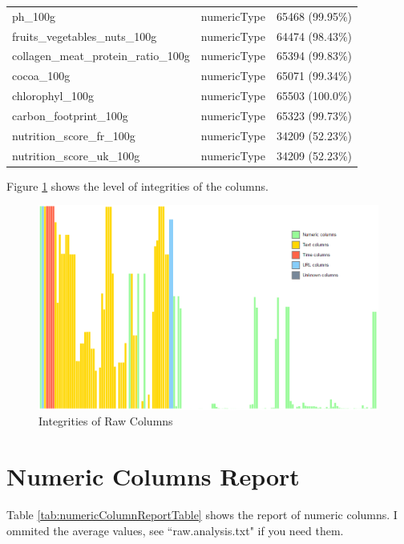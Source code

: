 \documentclass[11pt]{article}
\begin{document}
\begin{center}
\begin{longtable}{|l|c|r|}
ph\_100g& numericType& 65468 (99.95\%)\\
fruits\_vegetables\_nuts\_100g& numericType& 64474 (98.43\%)\\
collagen\_meat\_protein\_ratio\_100g& numericType& 65394 (99.83\%)\\
cocoa\_100g& numericType& 65071 (99.34\%)\\
chlorophyl\_100g& numericType& 65503 (100.0\%)\\
carbon\_footprint\_100g& numericType& 65323 (99.73\%)\\
nutrition\_score\_fr\_100g& numericType& 34209 (52.23\%)\\
nutrition\_score\_uk\_100g& numericType& 34209 (52.23\%)\\


\hline

\end{longtable}
\end{center}

Figure \ref{fig:columnReportFigure} shows the level of integrities of the columns.

\begin{figure}[!htp]
\centering
\includegraphics[width=\textwidth]{../vis/integrities.of.raw.columns.png}
\caption{Integrities of Raw Columns}
\label{fig:columnReportFigure}
\end{figure}

\section{Numeric Columns Report}

Table \ref{tab:numericColumnReportTable} shows the report of numeric columns. I ommited the average values, see ``raw.analysis.txt" if you need them.
\end{document}
